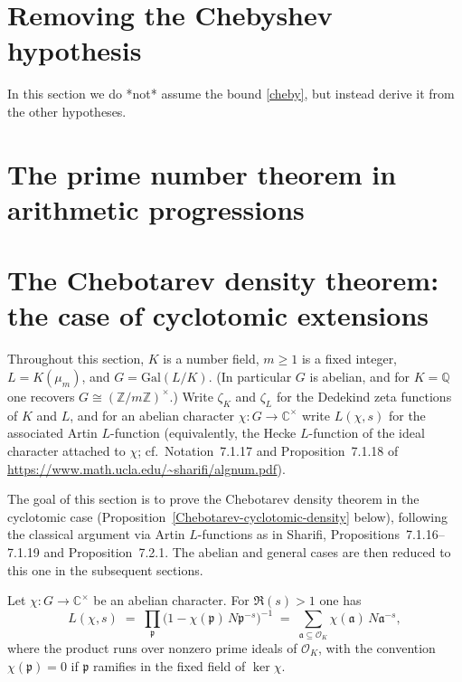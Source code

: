 {

\section{Removing the Chebyshev hypothesis}

In this section we do *not* assume the bound \eqref{cheby}, but instead derive it from the other hypotheses.





\section{The prime number theorem in arithmetic progressions}




\section{The Chebotarev density theorem: the case of cyclotomic extensions}

Throughout this section, $K$ is a number field, $m \geq 1$ is a fixed integer,
$L = K(\mu_m)$, and $G = \mathrm{Gal}(L/K)$.  (In particular $G$ is abelian, and for
$K=\mathbb{Q}$ one recovers $G \cong (\mathbb{Z}/m\mathbb{Z})^\times$.)
Write $\zeta_K$ and $\zeta_L$ for the Dedekind zeta functions of $K$ and $L$, and for
an abelian character $\chi : G \to \mathbb{C}^\times$ write $L(\chi,s)$ for the associated
Artin $L$-function (equivalently, the Hecke $L$-function of the ideal character attached to
$\chi$; cf.\ Notation~7.1.17 and Proposition~7.1.18 of
\url{https://www.math.ucla.edu/~sharifi/algnum.pdf}).

The goal of this section is to prove the Chebotarev density theorem in the cyclotomic case
(Proposition~\ref{Chebotarev-cyclotomic-density} below), following the classical argument via
Artin $L$-functions as in Sharifi, Propositions~7.1.16--7.1.19 and Proposition~7.2.1.  The
abelian and general cases are then reduced to this one in the subsequent sections.

\begin{lemma}\label{Artin-L-euler}
Let $\chi : G \to \mathbb{C}^\times$ be an abelian character.  For $\Re(s) > 1$ one has
\[
L(\chi,s) \;=\; \prod_{\mathfrak{p}} \bigl(1 - \chi(\mathfrak{p})\, N\mathfrak{p}^{-s}\bigr)^{-1}
\;=\; \sum_{\mathfrak{a} \subseteq \mathcal{O}_K} \chi(\mathfrak{a})\, N\mathfrak{a}^{-s},
\]
where the product runs over nonzero prime ideals of $\mathcal{O}_K$, with the convention
$\chi(\mathfrak{p}) = 0$ if $\mathfrak{p}$ ramifies in the fixed field of $\ker\chi$.
\end{lemma}

}
